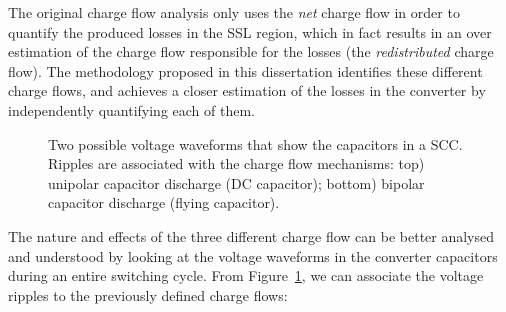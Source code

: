 The original charge flow analysis only uses the \emph{net} charge flow in order to quantify the produced losses in the SSL region, which in fact results in an over estimation of the charge flow responsible for the losses (the \emph{redistributed} charge flow). The methodology proposed in this dissertation identifies these different charge flows, and achieves a closer estimation of the losses in the converter by independently quantifying each of them.
\begin{figure}[!h]
\centering

\caption[Voltage ripple in the SCC's capacitors]{Two possible voltage waveforms that show the capacitors in a SCC. Ripples are associated with the charge flow mechanisms: top) unipolar capacitor discharge (DC capacitor); bottom) bipolar capacitor discharge (flying capacitor).}
\label{fig:cap_riples}
\end{figure}
The nature and effects of the three different charge flow can be better analysed and understood  by looking at the voltage waveforms in the converter capacitors during an entire switching cycle. From Figure~\ref{fig:cap_riples}, we can associate the voltage ripples to the previously defined charge flows:
